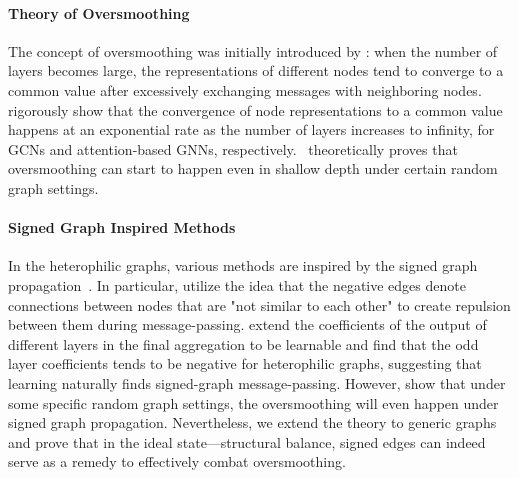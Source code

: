 \paragraph{Theory of Oversmoothing}
The concept of oversmoothing was initially introduced by \cite{oversmooth_first}: when the number of layers becomes large, the representations of different nodes tend to converge to a common value after excessively exchanging messages with neighboring nodes. 
\cite{Oono2019GraphNN, wu2023demystifying} rigorously show that the convergence of node representations to a common value happens at an exponential rate as the number of layers increases to infinity, for GCNs and attention-based GNNs, respectively. 
\cite{sbm_xinyi}~theoretically proves that oversmoothing can start to happen even in shallow depth under certain random graph settings.

\paragraph{Signed Graph Inspired Methods}
In the heterophilic graphs, various methods are inspired by the signed graph propagation~\citep{H2GNN,orderedgnn, yan2022two,acmp, GRP-GNN}. In particular,
\citet{yan2022two,acmp} utilize the idea that the negative edges denote connections between nodes that are "not similar to each other" to create repulsion between them during message-passing.
\cite{GRP-GNN} extend the coefficients of the output of different layers in the final aggregation to be learnable and find that the odd layer coefficients tends to be negative for heterophilic graphs, suggesting that learning naturally finds signed-graph message-passing. 
However, \cite{signremedy} show that under some specific random graph settings, the oversmoothing will even happen under signed graph propagation. 
Nevertheless, we extend the theory to generic graphs and prove that in the ideal state---structural balance, signed edges can indeed serve as a remedy to effectively combat oversmoothing. 

